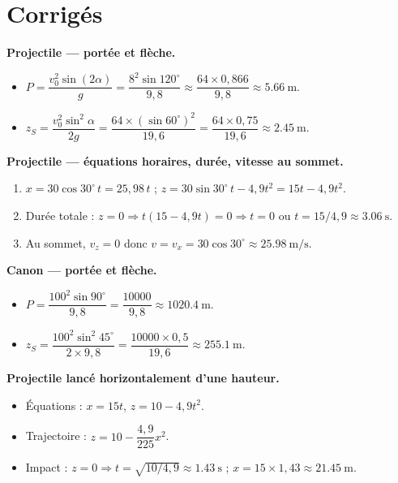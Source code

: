 \section{Corrigés}

\textbf{Projectile — portée et flèche.}
\begin{itemize}
\item $P = \dfrac{v_0^2\sin(2\alpha)}{g} = \dfrac{8^2\sin120^\circ}{9,8} \approx \dfrac{64\times0,866}{9,8} \approx \SI{5,66}{\metre}$.
\item $z_S = \dfrac{v_0^2\sin^2\alpha}{2g} = \dfrac{64\times(\sin60^\circ)^2}{19,6} = \dfrac{64\times0,75}{19,6} \approx \SI{2,45}{\metre}$.
\end{itemize}

\textbf{Projectile — équations horaires, durée, vitesse au sommet.}
\begin{enumerate}
\item $x = 30\cos30^\circ\,t = 25,98\,t$ ; $z = 30\sin30^\circ\,t - 4,9 t^2 = 15t - 4,9t^2$.
\item Durée totale : $z=0 \Rightarrow t(15-4,9t)=0 \Rightarrow t=0$ ou $t=15/4,9 \approx \SI{3,06}{\second}$.
\item Au sommet, $v_z=0$ donc $v = v_x = 30\cos30^\circ \approx \SI{25,98}{\metre\per\second}$.
\end{enumerate}

\textbf{Canon — portée et flèche.}
\begin{itemize}
\item $P = \dfrac{100^2\sin90^\circ}{9,8} = \dfrac{10000}{9,8} \approx \SI{1020,4}{\metre}$.
\item $z_S = \dfrac{100^2\sin^2 45^\circ}{2\times9,8} = \dfrac{10000\times0,5}{19,6} \approx \SI{255,1}{\metre}$.
\end{itemize}

\textbf{Projectile lancé horizontalement d’une hauteur.}
\begin{itemize}
\item Équations : $x = 15t$, $z = 10 - 4,9t^2$.
\item Trajectoire : $z = 10 - \dfrac{4,9}{225}x^2$.
\item Impact : $z=0 \Rightarrow t = \sqrt{10/4,9} \approx \SI{1,43}{\second}$ ; $x = 15\times1,43 \approx \SI{21,45}{\metre}$.
\end{itemize}


